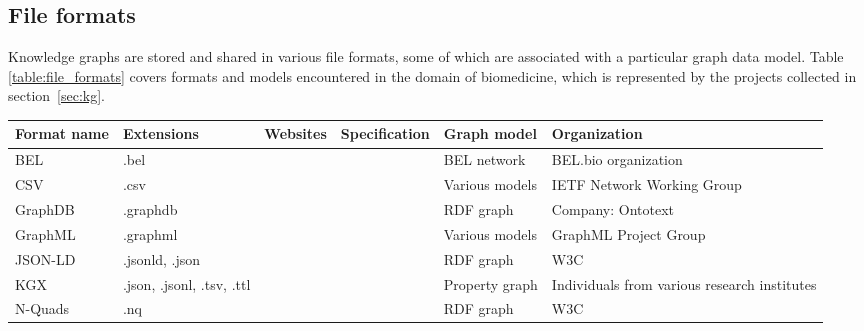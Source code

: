 \documentclass{article}
\begin{document}
\newpage
\begin{landscape}

\subsection{File formats}
\label{sec:file_formats}

Knowledge graphs are stored and shared in various file formats, some of which are associated with a particular graph data model. Table \ref{table:file_formats} covers formats and models encountered in the domain of biomedicine, which is represented by the projects collected in section~\ref{sec:kg}.


\begin{xltabular}{\textwidth}{p{3cm}|p{3cm}|p{2.2cm}|p{2.2cm}|p{2.2cm}|p{6cm}}
Format name
&
Extensions
&
Websites
&
Specification
&
Graph model
&
Organization
\\


\hline
\hline


BEL
&
.bel
&
\cite{bel_website1}
\cite{bel_website2}
&
\cite{bel_spec}
&
BEL network
&
BEL.bio organization
\cite{bel_group}
\\


\hline


CSV
&
.csv
&
\cite{csv_wiki}
&
\cite{csv_spec}
&
Various models
&
IETF Network Working Group
\cite{csv_group}
\\


\hline


GraphDB
&
.graphdb
&
\cite{graphdb_wiki}
&
\cite{graphdb_spec}
&
RDF graph
&
Company: Ontotext
\cite{graphdb_group}
\\


\hline


GraphML
&
.graphml
&
\cite{graphml_wiki}
&
\cite{graphml_spec}
&
Various models
&
GraphML Project Group
\cite{graphml_group}
\\


\hline


JSON-LD
&
.jsonld, .json
&
\cite{jsonld_wiki}
&
\cite{jsonld_spec}
&
RDF graph
&
W3C
\cite{w3c_group}
\\


\hline


KGX
&
.json, .jsonl, .tsv, .ttl
&
\cite{kgx_format_website}
&
\cite{kgx_format_spec}
&
Property graph
&
Individuals from various research institutes
\\


\hline


N-Quads
&
.nq
&
\cite{nquads_wiki}
&
\cite{nquads_spec}
&
RDF graph
&
W3C
\cite{w3c_group}
\\



\end{xltabular}
\end{landscape}
\end{document}
